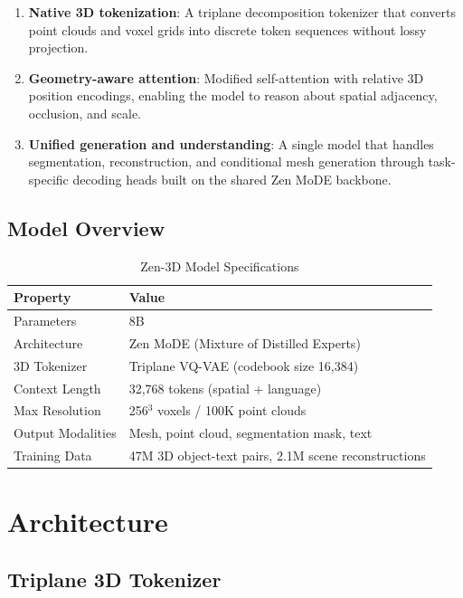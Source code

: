\documentclass[11pt,a4paper]{article}
\begin{document}
\begin{enumerate}
    \item \textbf{Native 3D tokenization}: A triplane decomposition tokenizer that converts point
    clouds and voxel grids into discrete token sequences without lossy projection.
    \item \textbf{Geometry-aware attention}: Modified self-attention with relative 3D position
    encodings, enabling the model to reason about spatial adjacency, occlusion, and scale.
    \item \textbf{Unified generation and understanding}: A single model that handles segmentation,
    reconstruction, and conditional mesh generation through task-specific decoding heads built on
    the shared Zen MoDE backbone.
\end{enumerate}

\subsection{Model Overview}

\begin{table}[H]
\centering
\begin{tabular}{ll}
\toprule
\textbf{Property} & \textbf{Value} \\
\midrule
Parameters & 8B \\
Architecture & Zen MoDE (Mixture of Distilled Experts) \\
3D Tokenizer & Triplane VQ-VAE (codebook size 16,384) \\
Context Length & 32,768 tokens (spatial + language) \\
Max Resolution & 256$^3$ voxels / 100K point clouds \\
Output Modalities & Mesh, point cloud, segmentation mask, text \\
Training Data & 47M 3D object-text pairs, 2.1M scene reconstructions \\
\bottomrule
\end{tabular}
\caption{Zen-3D Model Specifications}
\end{table}

\section{Architecture}

\subsection{Triplane 3D Tokenizer}
\end{document}
